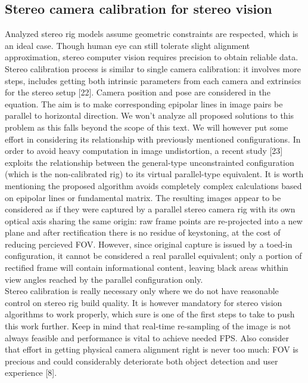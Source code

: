 \subsection{Stereo camera calibration for stereo vision}
Analyzed stereo rig models assume geometric constraints are respected, which is an ideal case. Though human eye can still tolerate slight alignment approximation, stereo computer vision requires precision to obtain reliable data. Stereo calibration process is similar to single camera calibration: it involves more steps, includes getting both intrinsic parameters from each camera and extrinsics for the stereo setup [22]. Camera position and pose are considered in the equation. The aim is to make corresponding epipolar lines in image pairs be parallel to horizontal direction. We won’t analyze all proposed solutions to this problem as this falls beyond the scope of this text. We will however put some effort in considering its relationship with previously mentioned configurations. In order to avoid heavy computation in image undistortion, a recent study [23] exploits the relationship between the general-type unconstrainted configuration (which is the non-calibrated rig) to its virtual parallel-type equivalent. It is worth mentioning the proposed algorithm avoids completely complex calculations based on epipolar lines or fundamental matrix. The resulting images appear to be considered as if they were captured by a parallel stereo camera rig with its own optical axis sharing the same origin: raw frame points are re-projected into a new plane and after rectification there is no residue of keystoning, at the cost of reducing percieved FOV. However, since original capture is issued by a toed-in configuration, it cannot be considered a real parallel equivalent; only a portion of rectified frame will contain informational content, leaving black areas whithin view angles reached by the parallel configuration only.\\
Stereo calibration is really necessary only where we do not have reasonable control on stereo rig build quality. It is however mandatory for stereo vision algorithms to work properly, which sure is one of the first steps to take to push this work further. Keep in mind that real-time re-sampling of the image is not always feasible and performance is vital to achieve needed FPS. Also consider that effort in getting physical camera alignment right is never too much: FOV is precious and could considerably deteriorate both object detection and user experience [8].

